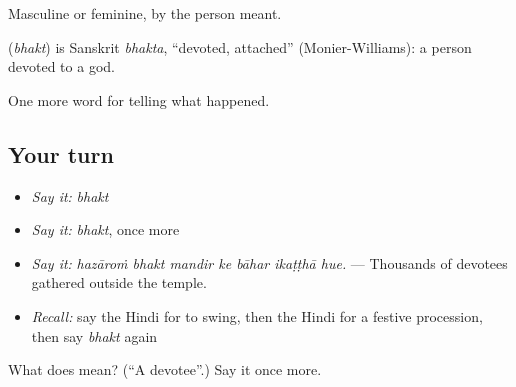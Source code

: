 Masculine or feminine, by the person meant.

\begin{cousinweb}
\textbf{} (\emph{bhakt}) is Sanskrit \emph{bhakta}, \textquotedblleft{}devoted, attached\textquotedblright{} (Monier-Williams): a person devoted to a god.
\end{cousinweb}

\begin{grammarlens}[title={What you've built}]
One more word for telling what happened.
\end{grammarlens}

\subsection*{Your turn}
\begin{itemize}
\raggedright
  \item \emph{Say it:} \emph{bhakt}
  \item \emph{Say it:} \emph{bhakt}, once more
  \item \emph{Say it:} \emph{hazāroṁ bhakt mandir ke bāhar ikaṭṭhā hue.} — Thousands of devotees gathered outside the temple.
  \item \emph{Recall:} say the Hindi for to swing, then the Hindi for a festive procession, then say \emph{bhakt} again
\end{itemize}

\begin{tcolorbox}[breakable,colback=teal!4,colframe=teal!35!black,title={Before you move on}]
What does  mean? (\textquotedblleft{}A devotee\textquotedblright{}.) Say it once more.
\end{tcolorbox}
